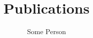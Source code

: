 \documentclass[a4paper]{article}
\title{Publications}
\author{Some Person}
\begin{document}
\maketitle

\nocite{*}


\end{document}
